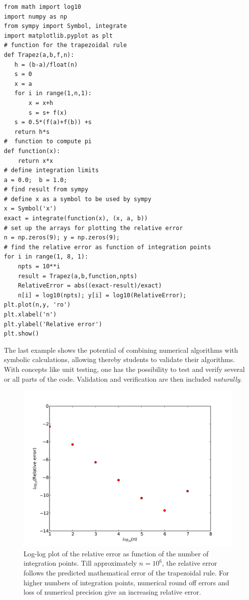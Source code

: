 \documentclass[graybox,envcountchap,sectrefs]{svmult}
\begin{document}
\begin{lstlisting}
from math import log10
import numpy as np
from sympy import Symbol, integrate
import matplotlib.pyplot as plt
# function for the trapezoidal rule
def Trapez(a,b,f,n):
   h = (b-a)/float(n)
   s = 0
   x = a
   for i in range(1,n,1):
       x = x+h
       s = s+ f(x)
   s = 0.5*(f(a)+f(b)) +s
   return h*s
#  function to compute pi
def function(x):
    return x*x
# define integration limits
a = 0.0;  b = 1.0;
# find result from sympy
# define x as a symbol to be used by sympy
x = Symbol('x')
exact = integrate(function(x), (x, a, b))
# set up the arrays for plotting the relative error
n = np.zeros(9); y = np.zeros(9);
# find the relative error as function of integration points
for i in range(1, 8, 1):
    npts = 10**i
    result = Trapez(a,b,function,npts)
    RelativeError = abs((exact-result)/exact)
    n[i] = log10(npts); y[i] = log10(RelativeError);
plt.plot(n,y, 'ro')
plt.xlabel('n')
plt.ylabel('Relative error')
plt.show()
\end{lstlisting}


The last example shows the potential of combining numerical algorithms
with symbolic calculations, allowing thereby students  to
validate their algorithms. With concepts like unit testing, one has
the possibility to test and verify several or all parts of the
code. Validation and verification are then included \emph{naturally}.
\begin{figure}
\includegraphics[scale=0.8]{Figures/error.pdf}
\caption{Log-log plot of the relative error as function of the number of integration points. Till approximately $n=10^6$, the relative error follows the predicted mathematical error of the trapezoidal rule. For higher numbers of integration points, numerical round off errors and loss of numerical precision give an increasing relative error.}\label{fig:error}
\end{figure}
\end{document}
